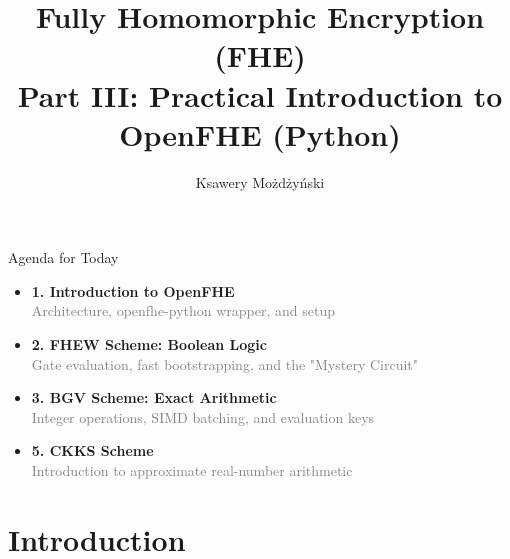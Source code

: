 \documentclass[aspectratio=169, 10pt]{beamer}
\title[FHE - Part III]{\textbf{Fully Homomorphic Encryption (FHE)}\\ \Large Part III: Practical Introduction to OpenFHE (Python)}
\author{Ksawery Możdżyński}
\date{}
\begin{document}
\begin{frame}
\titlepage
\end{frame}

\begin{frame}{Agenda for Today}
\Large
\begin{itemize}
    \item[\textcolor{AccentOrange}{\faPython}] \textbf{1. Introduction to OpenFHE} \\
    \textcolor{gray}{\small Architecture, openfhe-python wrapper, and setup}
    \vspace{0.3cm}

    \item[\textcolor{AccentOrange}{\faMicrochip}] \textbf{2. FHEW Scheme: Boolean Logic} \\
    \textcolor{gray}{\small Gate evaluation, fast bootstrapping, and the "Mystery Circuit"}
    \vspace{0.3cm}

    \item[\textcolor{AccentOrange}{\faCalculator}] \textbf{3. BGV Scheme: Exact Arithmetic} \\
    \textcolor{gray}{\small Integer operations, SIMD batching, and evaluation keys}
    \vspace{0.3cm}
    
    \item[\textcolor{AccentOrange}{\faBrain}] \textbf{5. CKKS Scheme} \\
    \textcolor{gray}{\small Introduction to approximate real-number arithmetic}
\end{itemize}
\end{frame}
\section{Introduction}
\end{document}
